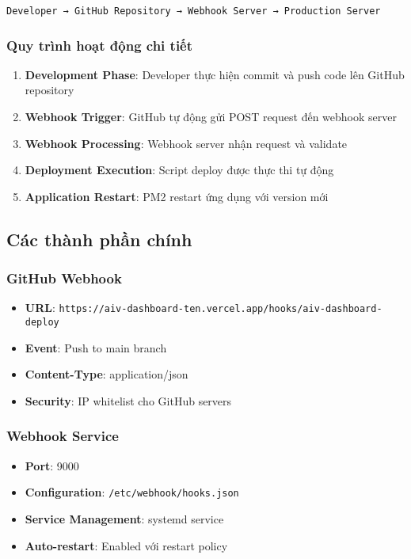 \documentclass[12pt,a4paper]{article}
\begin{document}
\begin{center}
\texttt{Developer → GitHub Repository → Webhook Server → Production Server}
\end{center}

\subsubsection{Quy trình hoạt động chi tiết}

\begin{enumerate}
    \item \textbf{Development Phase}: Developer thực hiện commit và push code lên GitHub repository
    \item \textbf{Webhook Trigger}: GitHub tự động gửi POST request đến webhook server
    \item \textbf{Webhook Processing}: Webhook server nhận request và validate
    \item \textbf{Deployment Execution}: Script deploy được thực thi tự động
    \item \textbf{Application Restart}: PM2 restart ứng dụng với version mới
\end{enumerate}

\subsection{Các thành phần chính}

\subsubsection{GitHub Webhook}
\begin{itemize}
    \item \textbf{URL}: \texttt{https://aiv-dashboard-ten.vercel.app/hooks/aiv-dashboard-deploy}
    \item \textbf{Event}: Push to main branch
    \item \textbf{Content-Type}: application/json
    \item \textbf{Security}: IP whitelist cho GitHub servers
\end{itemize}

\subsubsection{Webhook Service}
\begin{itemize}
    \item \textbf{Port}: 9000
    \item \textbf{Configuration}: \texttt{/etc/webhook/hooks.json}
    \item \textbf{Service Management}: systemd service
    \item \textbf{Auto-restart}: Enabled với restart policy
\end{itemize}
\end{document}
